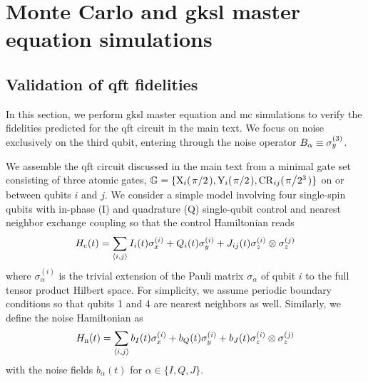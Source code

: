 \chapter{Monte Carlo and \texorpdfstring{\acrshort{gksl}}{GKSL} master equation simulations}\label{ch:app:ff:time_domain_methods}
\section{Validation of \texorpdfstring{\acrshort{qft}}{QFT} fidelities}\label{sec:app:ff:time_domain_methods:qft_validation}
In this section, we perform \gls{gksl} master equation and \gls{mc} simulations to verify the fidelities predicted for the \gls{qft} circuit in the main text.
We focus on noise exclusively on the third qubit, entering through the noise operator $B_\alpha\equiv\sigma_y^{(3)}$.

We assemble the \gls{qft} circuit discussed in the main text from a minimal gate set consisting of three atomic gates, $\mathbb{G} = \lbrace\mr{X}_{i}(\flatfrac{\pi}{2}),\mr{Y}_{i}(\flatfrac{\pi}{2}),\mr{CR}_{ij}(\flatfrac{\pi}{2^3})\rbrace$ on or between qubits $i$ and $j$.
We consider a simple model involving four single-spin qubits with in-phase (I) and quadrature (Q) single-qubit control and nearest neighbor exchange coupling so that the control Hamiltonian reads
\begin{equation}\label{eq:app:ff:control_hamiltonian:qft}
    H_{\mathrm{c}}(t) = \sum_{\langle i,j\rangle} I_i(t)\sigma_x^{(i)} + Q_i(t)\sigma_y^{(i)} + J_{ij}(t)\sigma_z^{(i)}\otimes\sigma_z^{(j)}
\end{equation}
where $\sigma_\alpha^{(i)}$ is the trivial extension of the Pauli matrix $\sigma_\alpha$ of qubit $i$ to the full tensor product Hilbert space.
For simplicity, we assume periodic boundary conditions so that qubits 1 and 4 are nearest neighbors as well.
Similarly, we define the noise Hamiltonian as
\begin{equation}\label{eq:app:ff:noise_hamiltonian:qft}
H_{\mathrm{n}}(t) = \sum_{\langle i,j\rangle} b_{I}(t)\sigma_x^{(i)} + b_{Q}(t)\sigma_y^{(i)} + b_{J}(t)\sigma_z^{(i)}\otimes\sigma_z^{(j)}
\end{equation}
with the noise fields $b_{\alpha}(t)$ for $\alpha\in\{I,Q,J\}$.

